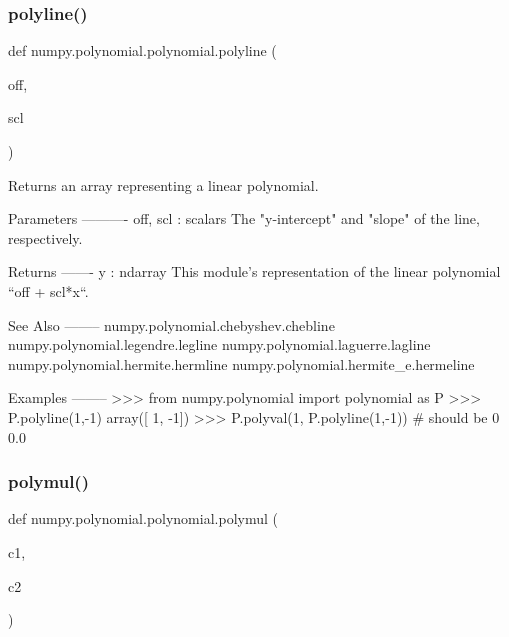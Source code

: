  \mbox{\label{namespacenumpy_1_1polynomial_1_1polynomial_abcebfe1fa5f34fc8f33af90043adeb5f}} 
\subsubsection{\texorpdfstring{polyline()}{polyline()}}
{\footnotesize\ttfamily def numpy.\+polynomial.\+polynomial.\+polyline (\begin{DoxyParamCaption}\item[{}]{off,  }\item[{}]{scl }\end{DoxyParamCaption})}

\begin{DoxyVerb}Returns an array representing a linear polynomial.

Parameters
----------
off, scl : scalars
    The "y-intercept" and "slope" of the line, respectively.

Returns
-------
y : ndarray
    This module's representation of the linear polynomial ``off +
    scl*x``.

See Also
--------
numpy.polynomial.chebyshev.chebline
numpy.polynomial.legendre.legline
numpy.polynomial.laguerre.lagline
numpy.polynomial.hermite.hermline
numpy.polynomial.hermite_e.hermeline

Examples
--------
>>> from numpy.polynomial import polynomial as P
>>> P.polyline(1,-1)
array([ 1, -1])
>>> P.polyval(1, P.polyline(1,-1)) # should be 0
0.0\end{DoxyVerb}
 \mbox{\label{namespacenumpy_1_1polynomial_1_1polynomial_aa293853d78763d5d30ba87f1be834dcc}} 
\subsubsection{\texorpdfstring{polymul()}{polymul()}}
{\footnotesize\ttfamily def numpy.\+polynomial.\+polynomial.\+polymul (\begin{DoxyParamCaption}\item[{}]{c1,  }\item[{}]{c2 }\end{DoxyParamCaption})}

